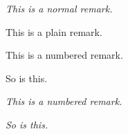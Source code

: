 \begin{remark*}
{\it This is a normal remark.}
\end{remark*}

\begin{remark*}
{\rm This is a plain remark.}
\end{remark*}

\begin{remark-click-numbered}
This is a numbered remark.
\end{remark-click-numbered}
\begin{remark-click-numbered}
So is this.
\end{remark-click-numbered}

\begin{remark}
{\it This is a numbered remark.}
\end{remark}
\begin{remark}
{\it So is this.}
\end{remark}
